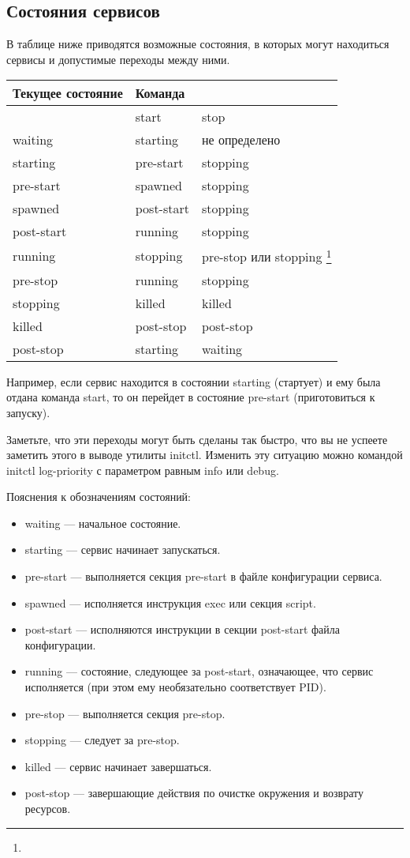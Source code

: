\subsection{Состояния сервисов}

В таблице ниже приводятся возможные состояния, в которых могут находиться сервисы и допустимые переходы между ними.
\begin{table}[h]
\begin{tabular}{|l|l|l|}
\hline Текущее состояние &  Команда  \\ 
\hline  & start & stop \\ 
\hline waiting & starting & не определено \\ 
\hline starting & pre-start & stopping \\ 
\hline pre-start & spawned & stopping \\ 
\hline spawned & post-start & stopping \\ 
\hline post-start & running & stopping \\
\hline running & stopping & pre-stop или stopping \footnote{} \\
\hline pre-stop & running & stopping \\
\hline stopping & killed & killed \\
\hline killed & post-stop & post-stop \\
\hline post-stop & starting & waiting \\
\hline
\end{tabular} 
\end{table}
Например, если сервис находится в состоянии starting (стартует) и ему была отдана команда start, то он перейдет в состояние pre-start (приготовиться к запуску).

Заметьте, что эти переходы могут быть сделаны так быстро, что вы не успеете заметить этого в выводе утилиты initctl. Изменить эту ситуацию можно командой initctl log-priority с параметром равным info
или debug.

Пояснения к обозначениям состояний: \begin{itemize}
\item waiting --- начальное состояние.
\item starting --- сервис начинает запускаться.
\item pre-start --- выполняется секция pre-start в файле конфигурации сервиса.
\item spawned --- исполняется инструкция exec или секция script.
\item post-start --- исполняются инструкции в секции post-start файла конфигурации.
\item running --- состояние, следующее за post-start, означающее, что сервис исполняется (при этом ему необязательно соответствует PID).
\item pre-stop --- выполняется секция pre-stop.
\item stopping --- следует за pre-stop. 
\item killed --- сервис начинает завершаться.
\item post-stop --- завершающие действия по очистке окружения и возврату ресурсов.
\end{itemize}
